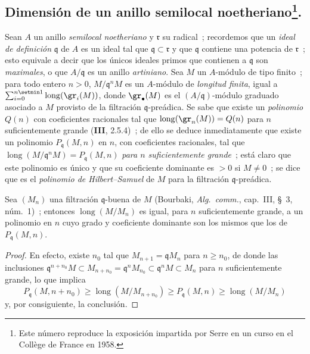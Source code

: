 \subsection[Dimensión de un anillo semilocal noetheriano]{Dimensión de un
anillo semilocal noetheriano\protect\footnote{Este número reproduce la exposición
impartida por Serre en un curso en el Collège de France en 1958.}.}
\label{subsection:0.16.2-fr}

\begin{env}[16.2.1]
\label{0.16.2.1-fr}
Sean $A$ un anillo \emph{semilocal noetheriano} y $\mathfrak{r}$ su radical~;
recordemos que un \emph{ideal de definición} $\mathfrak{q}$ de $A$ es un ideal tal que
$\mathfrak{q}\subset\mathfrak{r}$ y que $\mathfrak{q}$ contiene una potencia de
$\mathfrak{r}$~; esto equivale a decir que los únicos ideales primos que
contienen a $\mathfrak{q}$ son \emph{maximales}, o que $A/\mathfrak{q}$ es un anillo
\emph{artiniano}. Sea $M$ un $A$-módulo de tipo finito~; para todo entero $n>0$,
$M/\mathfrak{q}^nM$ es un $A$-módulo de \emph{longitud finita}, igual a
$\sum_{i=0}^{n\setmin 1}\operatorname{long}(\gr_i(M))$, donde $\gr_\bullet(M)$ es el
$(A/\mathfrak{q})$-módulo graduado asociado a $M$ provisto de la filtración
$\mathfrak{q}$-preádica. Se sabe que existe un \emph{polinomio} $Q(n)$ con
coeficientes racionales tal que $\operatorname{long}(\gr_n(M))=Q(n)$ para $n$
suficientemente grande (\textbf{III}, 2.5.4)~; de ello se deduce inmediatamente que
existe un polinomio $P_{\mathfrak{q}}(M,n)$ en $n$, con coeficientes racionales,
tal que
$\operatorname{long}(M/\mathfrak{q}^nM)=P_{\mathfrak{q}}(M,n)$
\emph{para $n$ suficientemente grande}~; está claro que este polinomio es único y que
su coeficiente dominante es $>0$ si $M\neq0$~; se dice que es el \emph{polinomio de
Hilbert--Samuel} de $M$ para la filtración $\mathfrak{q}$-preádica.
\end{env}


\begin{lemma}[16.2.2.1]
\label{0.16.2.2.1-fr}

Sea $(M_n)$ una filtración $\mathfrak{q}$-buena de $M$ \textup{(Bourbaki,
\emph{Alg.~comm.}, cap.~III, \S~3, núm.~1)}~; entonces
$\operatorname{long}(M/M_n)$ es igual, para $n$ suficientemente grande, a un
polinomio en $n$ cuyo grado y coeficiente dominante son los mismos que los de
$P_{\mathfrak{q}}(M,n)$.
\end{lemma}

\begin{proof}
En efecto, existe $n_0$ tal que $M_{n+1}=\mathfrak{q}M_n$ para $n\geq n_0$,
de donde las inclusiones
$\mathfrak{q}^{n+n_0}M\subset M_{n+n_0}=\mathfrak{q}^nM_{n_0}
\subset\mathfrak{q}^nM\subset M_n$ para $n$ suficientemente grande, lo que
implica
\[
  P_{\mathfrak{q}}(M,n+n_0)\geq
  \operatorname{long}(M/M_{n+n_0})\geq
  P_{\mathfrak{q}}(M,n)\geq\operatorname{long}(M/M_n)
\]
y, por consiguiente, la conclusión.
\end{proof}

